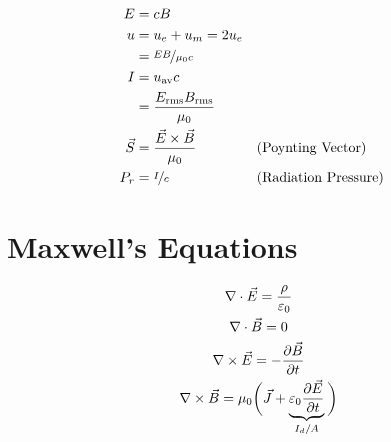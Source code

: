 \documentclass[10pt]{article}
\begin{document}
\begin{multicols*}{5}
\begin{align*}
    E &= cB\\
    u &= u_e + u_m = 2u_e\\
      &= \nicefrac{EB}{\mu_0 c}\\
    I &= u_\text{av}c\\
      &= \frac{E_\text{rms}B_\text{rms}}{\mu_0}\\
    \vec{S} &= \frac{\vec{E} \times \vec{B}}{\mu_0} && (\text{Poynting
	Vector})\\
    P_r &= \nicefrac{I}{c} && (\text{Radiation Pressure})
\end{align*}

\section{Maxwell's Equations}

\begin{gather*}
    \nabla \cdot \vec{E} = \frac{\rho}{\varepsilon_0}\\
    \nabla \cdot \vec{B} = 0\\
    \nabla \times \vec{E} = -\frac{\partial \vec{B}}{\partial t}\\
    \nabla \times \vec{B} = \mu_0 \bigg({\vec{J} +
	\underbrace{\varepsilon_0 \frac{\partial \vec{E}}{\partial
	    t}}_{I_d/A}}\hspace{0.5ex}\bigg)
\end{gather*}

\end{multicols*}
\newpage
\end{document}
